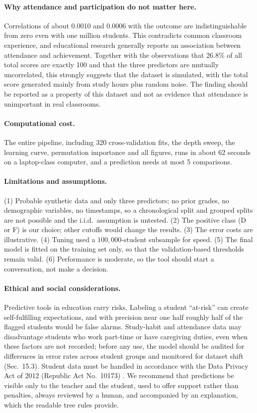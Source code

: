 \documentclass[12pt,a4paper]{article}
\theoremstyle{definition}
\begin{document}
\paragraph{Why attendance and participation do not matter here.} Correlations of about 0.0010 and 0.0006 with the outcome are indistinguishable from zero even with one million students. This contradicts common classroom experience, and educational research generally reports an association between attendance and achievement. Together with the observations that 26.8\% of all total scores are exactly 100 and that the three predictors are mutually uncorrelated, this strongly suggests that the dataset is simulated, with the total score generated mainly from study hours plus random noise. The finding should be reported as a property of this dataset and not as evidence that attendance is unimportant in real classrooms.

\paragraph{Computational cost.} The entire pipeline, including 320 cross-validation fits, the depth sweep, the learning curve, permutation importance and all figures, runs in about 62 seconds on a laptop-class computer, and a prediction needs at most 5 comparisons.

\paragraph{Limitations and assumptions.} (1) Probable synthetic data and only three predictors; no prior grades, no demographic variables, no timestamps, so a chronological split and grouped splits are not possible and the i.i.d.\ assumption is untested. (2) The positive class (D or F) is our choice; other cutoffs would change the results. (3) The error costs are illustrative. (4) Tuning used a $100{,}000$-student subsample for speed. (5) The final model is fitted on the training set only, so that the validation-based thresholds remain valid. (6) Performance is moderate, so the tool should start a conversation, not make a decision.

\paragraph{Ethical and social considerations.} Predictive tools in education carry risks. Labeling a student ``at-risk'' can create self-fulfilling expectations, and with precision near one half roughly half of the flagged students would be false alarms. Study-habit and attendance data may disadvantage students who work part-time or have caregiving duties, even when these factors are not recorded; before any use, the model should be audited for differences in error rates across student groups and monitored for dataset shift (Sec.~15.3). Student data must be handled in accordance with the Data Privacy Act of 2012 (Republic Act No.~10173) \cite{ra10173}. We recommend that predictions be visible only to the teacher and the student, used to offer support rather than penalties, always reviewed by a human, and accompanied by an explanation, which the readable tree rules provide.
\end{document}
